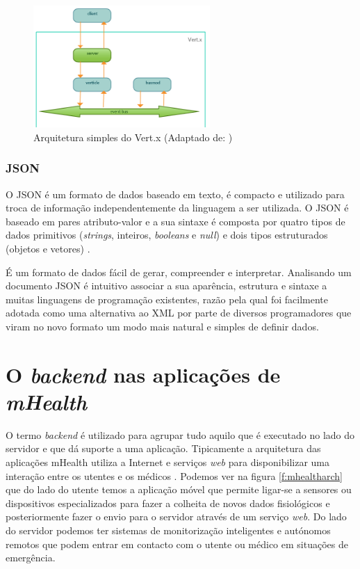 \begin{figure}[H]
  \centering
  \includegraphics[width=0.6\textwidth]{imgs/vertx_arch.png}
  \caption[Arquitetura simples do Vert.x]{Arquitetura simples do Vert.x (Adaptado de: \cite{vertx-study})}
  \label{f:vertxarch}
\end{figure}


\subsubsection{JSON}
O \gls{JSON} é um formato de dados baseado em texto, é compacto e utilizado para troca de informação independentemente da linguagem a ser utilizada. O \gls{JSON} é baseado em pares atributo-valor e a sua sintaxe é composta por quatro tipos de dados primitivos (\textit{strings}, inteiros, \textit{booleans} e \textit{null}) e dois tipos estruturados (objetos e vetores) \cite{json}. 
\par
É um formato de dados  fácil de gerar, compreender e interpretar. Analisando um documento \gls{JSON} é intuitivo associar a sua aparência, estrutura e sintaxe a muitas linguagens de programação existentes, razão pela qual foi facilmente adotada como uma alternativa ao \gls{XML} por parte de diversos programadores que viram no novo formato um modo mais natural e simples de definir dados.



\newpage
\section{O \textit{backend} nas aplicações de \textit{mHealth}}
O termo \textit{backend} é utilizado para agrupar tudo aquilo que é executado no lado do servidor e que dá suporte a uma aplicação. Tipicamente a arquitetura das aplica\c c\~oes mHealth utiliza a Internet e serviços \textit{web} para disponibilizar uma intera\c c\~ao entre os utentes e os m\'edicos \cite{mhealth}. Podemos ver na figura \ref{f:mhealtharch} que do lado do utente temos a aplicação móvel que permite ligar-se a sensores ou dispositivos especializados para fazer a colheita de novos dados fisiológicos e posteriormente fazer o envio para o servidor através de um serviço \textit{web}. Do lado do servidor podemos ter sistemas de monitorização inteligentes e autónomos remotos que podem entrar em contacto com o utente ou médico em situações de emergência.

